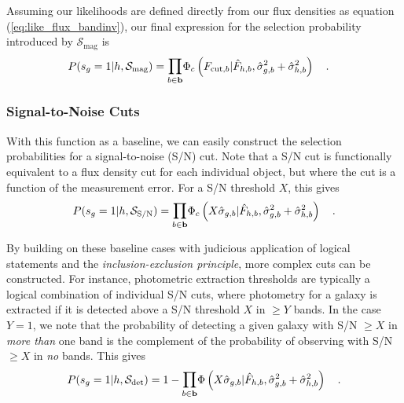 \documentclass[a4paper,fleqn,usenatbib,english]{mnras}
\newcommand{\rom}[2]{\ensuremath{#1_{\mathrm{#2}}}} %
\begin{document}
Assuming our likelihoods are defined directly from our flux densities as equation (\ref{eq:like_flux_bandinv}), our final expression for the selection probability introduced by $\rom{\mathcal{S}}{mag}$ is
\begin{align}
P(s_g=1|h,\rom{\mathcal{S}}{mag}) &= \mathlarger{\prod}_{b\in\mathbf{b}} \Phi_c \left( F_{\mathrm{cut},b} | \hat{F}_{h,b}, \hat{\sigma}^2_{g,b}+\hat{\sigma}^2_{h,b} \right) \quad .
\end{align}

\subsubsection{Signal-to-Noise Cuts}
\label{subsubsec:sel_sn}

With this function as a baseline, we can easily construct the selection probabilities for a signal-to-noise (S/N) cut. Note that a S/N cut is functionally equivalent to a flux density cut for each individual object, but where the cut is a function of the measurement error. For a S/N threshold $X$, this gives
\begin{equation}
P(s_g=1|h,\rom{\mathcal{S}}{S/N}) = \mathlarger{\prod}_{b\in\mathbf{b}} \Phi_c \left( X\hat{\sigma}_{g,b} | \hat{F}_{h,b}, \hat{\sigma}^2_{g,b}+\hat{\sigma}^2_{h,b} \right) \quad .
\end{equation}

By building on these baseline cases with judicious application of logical statements and the \textit{inclusion-exclusion principle}, more complex cuts can be constructed. For instance, photometric extraction thresholds are typically a logical combination of individual S/N cuts, where photometry for a galaxy is extracted if it is detected above a S/N threshold $X$ in $\geq Y$ bands. In the case $Y=1$, we note that the probability of detecting a given galaxy with S/N $\geq X$ in \textit{more than} one band is the complement of the probability of observing with S/N $\geq X$ in \textit{no} bands. This gives
\begin{equation}
P(s_g=1|h,\rom{\mathcal{S}}{det}) = 1 - \mathlarger{\prod}_{b\in\mathbf{b}} \Phi \left( X\hat{\sigma}_{g,b} | \hat{F}_{h,b}, \hat{\sigma}^2_{g,b}+\hat{\sigma}^2_{h,b} \right) \quad .
\end{equation}
\end{document}

